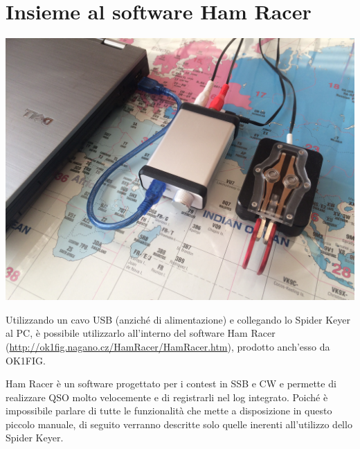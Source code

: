 \section{Insieme al software Ham Racer}
\begin{center}
	\includegraphics[width=\linewidth]{./PC.JPG}
\end{center}
Utilizzando un cavo USB (anzich\'e di alimentazione) e collegando lo Spider Keyer al PC, \`e possibile utilizzarlo all'interno del software Ham Racer (\url{http://ok1fig.nagano.cz/HamRacer/HamRacer.htm}), prodotto anch'esso da OK1FIG.

Ham Racer \`e un software progettato per i contest in SSB e CW e permette di realizzare QSO molto velocemente e di registrarli nel log integrato.
Poich\'e \`e impossibile parlare di tutte le funzionalit\`a che mette a disposizione in questo piccolo manuale, di seguito verranno descritte solo quelle inerenti all'utilizzo dello Spider Keyer.

